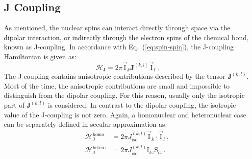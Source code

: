 \subsection{J Coupling}
As mentioned, the nuclear spins can interact directly through space via the dipolar interaction, or indirectly through the electron spins of the chemical bond, known as J-coupling.
In accordance with Eq.~(\ref{eq:spin-spin}), the J-coupling Hamiltonian is given as:
\begin{equation}
\mathcal{{H}}_{\textrm{J}} = 2 \pi {\vec{\textrm{I}}}_k \mathbf{J}^{(k,l)} {\vec{\textrm{I}}}_l~.
\end{equation}
The J-coupling contains anisotropic contributions described by the tensor $\mathbf{J}^{(k,l)}$. Most of the time, the anisotropic contributions are small and impossible to distinguish from the dipolar coupling. For this reason, usually only the isotropic part of $\mathbf{J}^{(k,l)}$ is considered. In contrast to the dipolar coupling, the isotropic value of the J-coupling is not zero. 
Again, a homonuclear and heteronuclear case can be separately defined in secular approximation as:
\begin{align}
\mathcal{{H}}_{\textrm{J}}^{\textrm{homo}} &= 2 \pi J_{\textrm{iso}}^{(k,l)} {\vec{\textrm{I}}}_k \cdot {\vec{\textrm{I}}}_l ~,\\
\mathcal{{H}}_{\textrm{J}}^{\textrm{hetero}} &= 2 \pi J_{\textrm{iso}}^{(k,l)} {\textrm{I}}_{kz} {\textrm{S}}_{lz}~.
\end{align}

